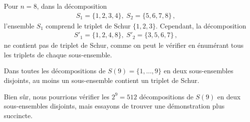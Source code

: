 \begin{example} Pour $n=8$, dans la décomposition 
\begin{align}
S_1 = \{1,2,3,4\},\; S_2 = \{5,6,7,8\}\,,
\label{eq.schur0}
\end{align}
l'ensemble $S_1$ comprend le triplet de Schur $\{1,2,3\}$.
Cependant, la décomposition 
\begin{align}
S'_1 = \{1,2,4,8\},\; S'_2 = \{3,5,6,7\}\,,
\label{eq:schur1}
\end{align}
ne contient pas de triplet de Schur, comme on peut le vérifier en énumérant tous les triplets de chaque sous-ensemble.
\end{example}

\begin{theorem}
Dans toutes les décompositions de $S(9)=\{1,\ldots,9\}$ en deux sous-ensembles disjoints, au moins un sous-ensemble contient un triplet de Schur.
\end{theorem}
Bien sûr, nous pourrions vérifier les $2^9=512$ décompositions de $S(9)$ en deux sous-ensembles disjoints, mais essayons de trouver une démonstration plus succincte.
